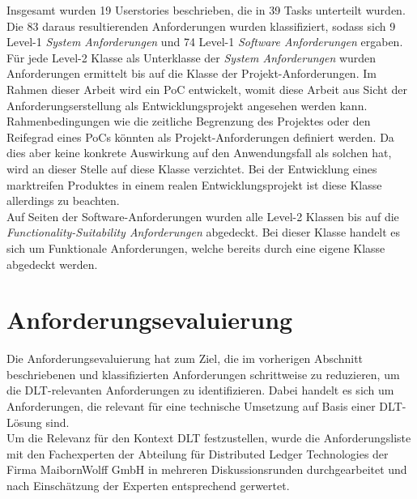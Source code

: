 Insgesamt wurden 19 Userstories beschrieben, die in 39 Tasks unterteilt wurden. Die 83 daraus resultierenden Anforderungen wurden klassifiziert, sodass sich 9 Level-1 \textit{System Anforderungen} und 74 Level-1 \textit{Software Anforderungen} ergaben. Für jede Level-2 Klasse als Unterklasse der \textit{System Anforderungen} wurden Anforderungen ermittelt bis auf die Klasse der Projekt-Anforderungen. Im Rahmen dieser Arbeit wird ein \ac{PoC} entwickelt, womit diese Arbeit aus Sicht der Anforderungserstellung als Entwicklungsprojekt angesehen werden kann. Rahmenbedingungen wie die zeitliche Begrenzung des Projektes oder den Reifegrad eines \ac{PoC}s könnten als Projekt-Anforderungen definiert werden. Da dies aber keine konkrete Auswirkung auf den Anwendungsfall als solchen hat, wird an dieser Stelle auf diese Klasse verzichtet. Bei der Entwicklung eines marktreifen Produktes in einem realen Entwicklungsprojekt ist diese Klasse allerdings zu beachten.\\
Auf Seiten der Software-Anforderungen wurden alle Level-2 Klassen bis auf die \textit{Functionality-Suitability Anforderungen} abgedeckt. Bei dieser Klasse handelt es sich um Funktionale Anforderungen, welche bereits durch eine eigene Klasse abgedeckt werden.

%
%
\section{Anforderungsevaluierung}
\label{sec:requirements:evaluation}
Die Anforderungsevaluierung hat zum Ziel, die im vorherigen Abschnitt beschriebenen und klassifizierten Anforderungen schrittweise zu reduzieren, um die \ac{DLT}-relevanten Anforderungen zu identifizieren. Dabei handelt es sich um Anforderungen, die relevant für eine technische Umsetzung auf Basis einer \ac{DLT}-Lösung sind.\\
Um die Relevanz für den Kontext \ac{DLT} festzustellen, wurde die Anforderungsliste mit den Fachexperten der Abteilung für Distributed Ledger Technologies der Firma MaibornWolff GmbH in mehreren Diskussionsrunden durchgearbeitet und nach Einschätzung der Experten entsprechend gerwertet.


